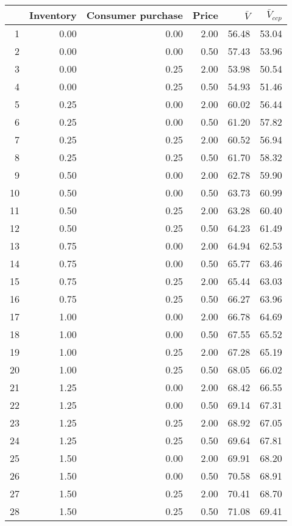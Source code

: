 \begin{tabular}{rrrrrr}
  \hline
 & Inventory & Consumer purchase & Price & $\bar{V}$ & $\bar{V}_{ccp}$ \\ 
  \hline
1 & 0.00 & 0.00 & 2.00 & 56.48 & 53.04 \\ 
  2 & 0.00 & 0.00 & 0.50 & 57.43 & 53.96 \\ 
  3 & 0.00 & 0.25 & 2.00 & 53.98 & 50.54 \\ 
  4 & 0.00 & 0.25 & 0.50 & 54.93 & 51.46 \\ 
  5 & 0.25 & 0.00 & 2.00 & 60.02 & 56.44 \\ 
  6 & 0.25 & 0.00 & 0.50 & 61.20 & 57.82 \\ 
  7 & 0.25 & 0.25 & 2.00 & 60.52 & 56.94 \\ 
  8 & 0.25 & 0.25 & 0.50 & 61.70 & 58.32 \\ 
  9 & 0.50 & 0.00 & 2.00 & 62.78 & 59.90 \\ 
  10 & 0.50 & 0.00 & 0.50 & 63.73 & 60.99 \\ 
  11 & 0.50 & 0.25 & 2.00 & 63.28 & 60.40 \\ 
  12 & 0.50 & 0.25 & 0.50 & 64.23 & 61.49 \\ 
  13 & 0.75 & 0.00 & 2.00 & 64.94 & 62.53 \\ 
  14 & 0.75 & 0.00 & 0.50 & 65.77 & 63.46 \\ 
  15 & 0.75 & 0.25 & 2.00 & 65.44 & 63.03 \\ 
  16 & 0.75 & 0.25 & 0.50 & 66.27 & 63.96 \\ 
  17 & 1.00 & 0.00 & 2.00 & 66.78 & 64.69 \\ 
  18 & 1.00 & 0.00 & 0.50 & 67.55 & 65.52 \\ 
  19 & 1.00 & 0.25 & 2.00 & 67.28 & 65.19 \\ 
  20 & 1.00 & 0.25 & 0.50 & 68.05 & 66.02 \\ 
  21 & 1.25 & 0.00 & 2.00 & 68.42 & 66.55 \\ 
  22 & 1.25 & 0.00 & 0.50 & 69.14 & 67.31 \\ 
  23 & 1.25 & 0.25 & 2.00 & 68.92 & 67.05 \\ 
  24 & 1.25 & 0.25 & 0.50 & 69.64 & 67.81 \\ 
  25 & 1.50 & 0.00 & 2.00 & 69.91 & 68.20 \\ 
  26 & 1.50 & 0.00 & 0.50 & 70.58 & 68.91 \\ 
  27 & 1.50 & 0.25 & 2.00 & 70.41 & 68.70 \\ 
  28 & 1.50 & 0.25 & 0.50 & 71.08 & 69.41 \\ 

\end{tabular}
